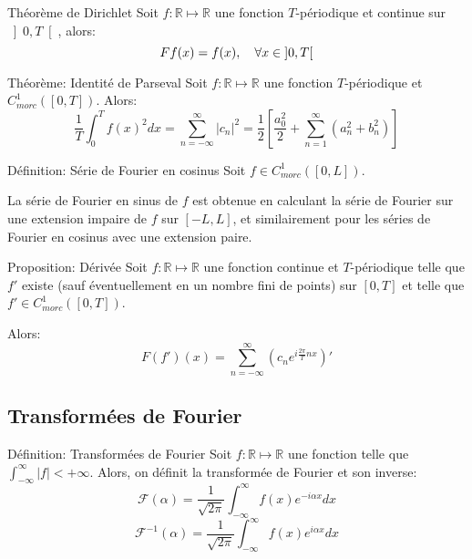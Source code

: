 \documentclass[a4paper]{article}
\begin{document}
\begin{parag}{Théorème de Dirichlet}
    Soit $f: \mathbb{R} \mapsto \mathbb{R}$ une fonction $T$-périodique et continue sur $\left]0, T\right[ $, alors: 
    \[F f\left(x\right) = f\left(x\right), \mathspace \forall x \in \left]0, T\right[ \]
\end{parag}

\begin{parag}{Théorème: Identité de Parseval}
    Soit $f: \mathbb{R} \mapsto \mathbb{R}$ une fonction $T$-périodique et $C_{morc}^{1}\left(\left[0, T\right]\right)$. Alors: 
    \[\frac{1}{T} \int_{0}^{T} f\left(x\right)^2 dx = \sum_{n=-\infty}^{\infty} \left|c_n\right|^2 = \frac{1}{2} \left[\frac{a_0^2}{2}+ \sum_{n=1}^{\infty} \left(a_n^2 + b_n^2\right)\right]\]
\end{parag}


\begin{parag}{Définition: Série de Fourier en cosinus}
    Soit $f \in C_{morc}^1\left(\left[0, L\right]\right)$.

    La série de Fourier en sinus de $f$ est obtenue en calculant la série de Fourier sur une extension impaire de $f$ sur $\left[-L, L\right]$, et similairement pour les séries de Fourier en cosinus avec une extension paire.
\end{parag}

\begin{parag}{Proposition: Dérivée}
    Soit $f: \mathbb{R} \mapsto \mathbb{R}$ une fonction continue et $T$-périodique telle que $f'$ existe (sauf éventuellement en un nombre fini de points) sur $\left[0, T\right]$ et telle que $f' \in C^1_{morc}\left(\left[0, T\right]\right)$.

    Alors:
    \[F\left(f'\right)\left(x\right) = \sum_{n=-\infty}^{\infty} \left(c_n e^{i \frac{2\pi}{T} nx}\right)'\]
\end{parag}

\subsection{Transformées de Fourier}
\begin{parag}{Définition: Transformées de Fourier}
    Soit $f: \mathbb{R} \mapsto \mathbb{R}$ une fonction telle que $\int_{-\infty}^{\infty} \left|f\right| < +\infty$. Alors, on définit la transformée de Fourier et son inverse: 
    \[\mathcal{F}\left(\alpha\right) = \frac{1}{\sqrt{2\pi}} \int_{-\infty}^{\infty} f\left(x\right) e^{-i \alpha x} dx\]
    \[\mathcal{F}^{-1}\left(\alpha\right) = \frac{1}{\sqrt{2\pi}} \int_{-\infty}^{\infty} f\left(x\right) e^{i \alpha x} dx\]
    
\end{parag}
\end{document}
